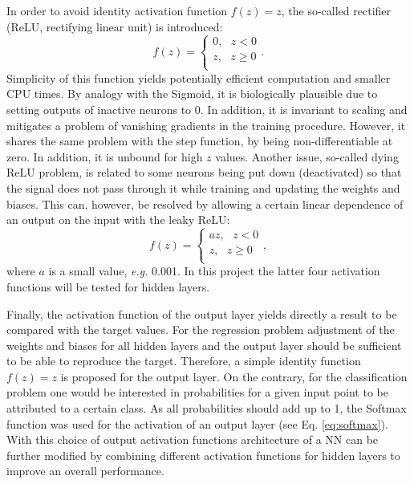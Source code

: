\documentclass{emulateapj}
\begin{document}
In order to avoid identity activation function $f(z)=z$, the so-called rectifier (ReLU, rectifying linear unit) is introduced:
\begin{equation}
    f(z)=\begin{cases}
               0, \mbox{ }z<0\\
               z, \mbox{ } z\geq 0\\
            \end{cases}.
\end{equation}
Simplicity of this function yields potentially efficient computation and smaller CPU times. By analogy with the Sigmoid, it is biologically plausible due to setting outputs of inactive neurons to 0. In addition, it is invariant to scaling and mitigates a problem of vanishing gradients in the training procedure. However, it shares the same problem with the step function, by being non-differentiable at zero. In addition, it is unbound for high $z$ values. Another issue, so-called dying ReLU problem, is related to some neurons being put down (deactivated) so that the signal does not pass through it while training and updating the weights and biases. This can, however, be resolved by allowing a certain linear dependence of an output on the input with the leaky ReLU:
\begin{equation}
    f(z)=\begin{cases}
               az, \mbox{ }z<0\\
               z, \mbox{ } z\geq 0\\
            \end{cases},
\end{equation}
where $a$ is a small value, \textit{e.g.} 0.001. In this project the latter four activation functions will be tested for hidden layers.

Finally, the activation function of the output layer yields directly a result to be compared with the target values. For the regression problem adjustment of the weights and biases for all hidden layers and the output layer should be sufficient to be able to reproduce the target. Therefore, a simple identity function $f(z)=z$ is proposed for the output layer. On the contrary, for the classification problem one would be interested in probabilities for a given input point to be attributed to a certain class. As all probabilities should add up to 1, the Softmax function was used for the activation of an output layer (see Eq. \ref{eq:softmax}). With this choice of output activation functions architecture of a NN can be further modified by combining different activation functions for hidden layers to improve an overall performance.
\end{document}
